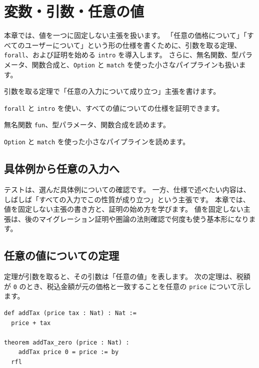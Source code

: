\chapter{変数・引数・任意の値}
\label{chap:ch07_variables_and_forall}

\begin{chapterabstract}
本章では、値を一つに固定しない主張を扱います。
「任意の価格について」「すべてのユーザーについて」という形の仕様を書くために、引数を取る定理、\texttt{forall}、および証明を始める \texttt{intro} を導入します。
さらに、無名関数、型パラメータ、関数合成と、\texttt{Option} と \texttt{match} を使った小さなパイプラインも扱います。
\end{chapterabstract}

\begin{learninggoals}
\item 引数を取る定理で「任意の入力について成り立つ」主張を書けます。
\item \texttt{forall} と \texttt{intro} を使い、すべての値についての仕様を証明できます。
\item 無名関数 \texttt{fun}、型パラメータ、関数合成を読めます。
\item \texttt{Option} と \texttt{match} を使った小さなパイプラインを読めます。
\end{learninggoals}

\section{具体例から任意の入力へ}

テストは、選んだ具体例についての確認です。
一方、仕様で述べたい内容は、しばしば「すべての入力でこの性質が成り立つ」という主張です。
本章では、値を固定しない主張の書き方と、証明の始め方を学びます。
値を固定しない主張は、後のマイグレーション証明や圏論の法則確認で何度も使う基本形になります。

\section{任意の値についての定理}

定理が引数を取ると、その引数は「任意の値」を表します。
次の定理は、税額が \texttt{0} のとき、税込金額が元の価格と一致することを任意の \texttt{price} について示します。

\begin{listing}[htbp]
\begin{verbatim}
def addTax (price tax : Nat) : Nat :=
  price + tax

theorem addTax_zero (price : Nat) :
    addTax price 0 = price := by
  rfl
\end{verbatim}
\caption{\texttt{addTax\_zero}}
\label{lst:ch07_forall_price}
\end{listing}


